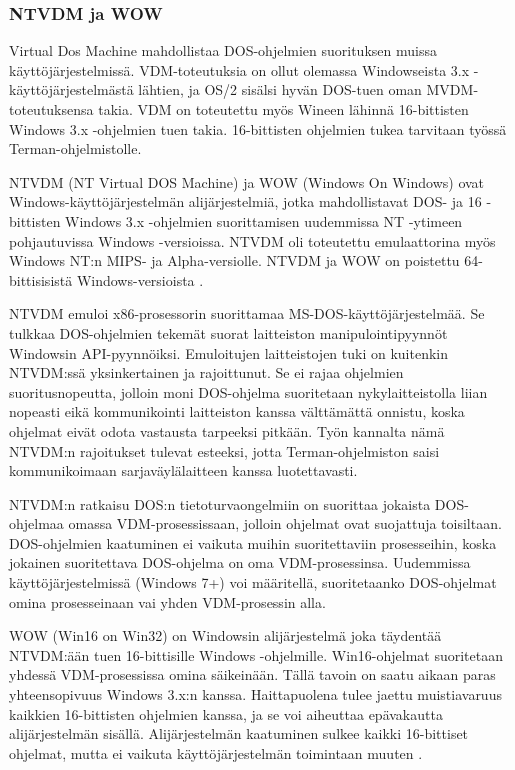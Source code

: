 \subsubsection{NTVDM ja WOW}
Virtual Dos Machine mahdollistaa DOS-ohjelmien suorituksen muissa käyttöjärjestelmissä. VDM-toteutuksia on ollut olemassa Windowseista 3.x -käyttöjärjestelmästä lähtien, ja OS/2 sisälsi hyvän DOS-tuen oman MVDM-toteutuksensa takia. VDM on toteutettu myös Wineen lähinnä 16-bittisten Windows 3.x -ohjelmien tuen takia. 16-bittisten ohjelmien tukea tarvitaan työssä Terman-ohjelmistolle.

NTVDM (NT Virtual DOS Machine) ja WOW (Windows On Windows) ovat Windows-käyttöjärjestelmän alijärjestelmiä, jotka mahdollistavat DOS- ja 16 -bittisten Windows 3.x -ohjelmien suorittamisen uudemmissa NT -ytimeen pohjautuvissa Windows -versioissa. NTVDM oli toteutettu emulaattorina myös Windows NT:n MIPS- ja Alpha-versiolle. NTVDM ja WOW on poistettu 64-bittisisistä Windows-versioista \cite{ntvdm_2}.

NTVDM emuloi x86-prosessorin suorittamaa MS-DOS-käyttöjärjestelmää. Se tulkkaa DOS-ohjelmien tekemät suorat laitteiston manipulointipyynnöt Windowsin API-pyynnöiksi. Emuloitujen laitteistojen tuki on kuitenkin NTVDM:ssä yksinkertainen ja rajoittunut. Se ei rajaa ohjelmien suoritusnopeutta, jolloin moni DOS-ohjelma suoritetaan nykylaitteistolla liian nopeasti eikä kommunikointi laitteiston kanssa välttämättä onnistu, koska ohjelmat eivät odota vastausta tarpeeksi pitkään. Työn kannalta nämä NTVDM:n rajoitukset tulevat esteeksi, jotta Terman-ohjelmiston saisi kommunikoimaan sarjaväylälaitteen kanssa luotettavasti.

NTVDM:n ratkaisu DOS:n tietoturvaongelmiin on suorittaa jokaista DOS-ohjelmaa omassa VDM-prosessissaan, jolloin ohjelmat ovat suojattuja toisiltaan. DOS-ohjelmien kaatuminen ei vaikuta muihin suoritettaviin prosesseihin, koska jokainen suoritettava DOS-ohjelma on oma VDM-prosessinsa. Uudemmissa käyttöjärjestelmissä (Windows 7+) voi määritellä, suoritetaanko DOS-ohjelmat omina prosesseinaan vai yhden VDM-prosessin alla.

WOW (Win16 on Win32) on Windowsin alijärjestelmä joka täydentää NTVDM:ään tuen 16-bittisille Windows -ohjelmille. Win16-ohjelmat suoritetaan yhdessä VDM-prosessissa omina säikeinään. Tällä tavoin on saatu aikaan paras yhteensopivuus Windows 3.x:n kanssa. Haittapuolena tulee jaettu muistiavaruus kaikkien 16-bittisten ohjelmien kanssa, ja se voi aiheuttaa epävakautta alijärjestelmän sisällä. Alijärjestelmän kaatuminen sulkee kaikki 16-bittiset ohjelmat, mutta ei vaikuta käyttöjärjestelmän toimintaan muuten \cite{ntvdm_kb}.


